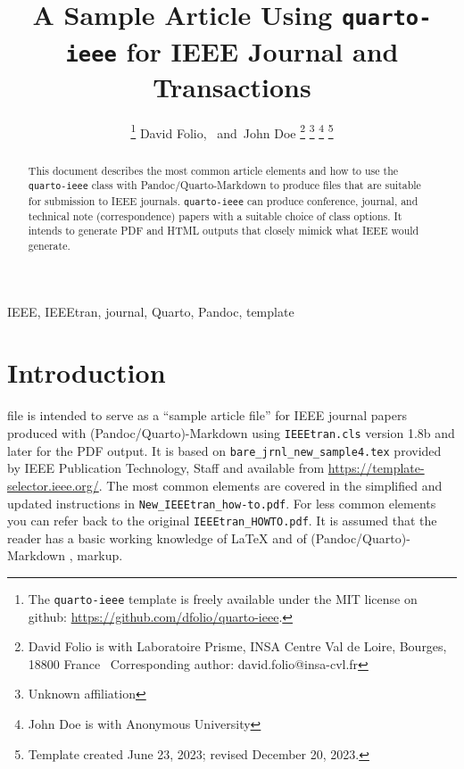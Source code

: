 \documentclass[
  journal,
]{IEEEtran}%
\title{A Sample Article Using \texttt{quarto-ieee} for IEEE Journal and
Transactions}
\author{
\thanks{The \texttt{quarto-ieee} template is freely available under the
MIT license on github: \url{https://github.com/dfolio/quarto-ieee}.}
David Folio\orcidlink{0000-0001-9430-6091},~\IEEEmembership{Member,
IEEE}
and~John Doe%
\thanks{David Folio is with Laboratoire Prisme, INSA Centre Val de
Loire, Bourges, 18800 France%
  Corresponding author: david.folio@insa-cvl.fr
}
\thanks{Unknown affiliation}
\thanks{John Doe is with Anonymous University%
}
\thanks{Template created June 23, 2023; revised December 20, 2023.}
}
\theoremstyle{plain}
\theoremstyle{remark}
\begin{document}


\maketitle

\begin{abstract}
This document describes the most common article elements and how to use
the \texttt{quarto-ieee} class with Pandoc/Quarto-Markdown to produce
files that are suitable for submission to IEEE journals.
\texttt{quarto-ieee} can produce conference, journal, and technical note
(correspondence) papers with a suitable choice of class options. It
intends to generate PDF and HTML outputs that closely mimick what IEEE
would generate.
\end{abstract}
\begin{IEEEkeywords}
IEEE, IEEEtran, journal, Quarto, Pandoc, template
\end{IEEEkeywords}

%


\section{Introduction}\label{sec-intro}

 file is intended to serve as a ``sample article
file'' for IEEE journal papers produced with (Pandoc/Quarto)-Markdown
using \texttt{IEEEtran.cls} version 1.8b and later for the PDF output.
It is based on \texttt{bare\_jrnl\_new\_sample4.tex} provided by IEEE
Publication Technology, Staff and available from
\url{https://template-selector.ieee.org/}. The most common elements are
covered in the simplified and updated instructions in
\texttt{New\_IEEEtran\_how-to.pdf}. For less common elements you can
refer back to the original \texttt{IEEEtran\_HOWTO.pdf}. It is assumed
that the reader has a basic working knowledge of {\LaTeX}
 and of
(Pandoc/Quarto)-Markdown ,
 markup.
\end{document}
